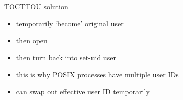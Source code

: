 \begin{frame}{TOCTTOU solution}
\begin{itemize}
\item temporarily `become' original user
\item then open
\item then turn back into set-uid user
\vspace{.5cm}
\item this is why POSIX processes have multiple user IDs
\item can swap out effective user ID temporarily
\end{itemize}
\end{frame}

